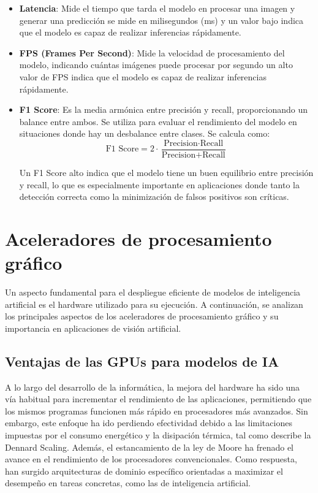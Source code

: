 \documentclass[11pt,spanish,listoffigures,listoftables]{tfgetsinf}
\begin{document}
\begin{itemize}
   \item \textbf{Latencia}: Mide el tiempo que tarda el modelo en procesar una imagen y generar una predicción se mide en milisegundos (ms) y un valor bajo indica que el modelo es capaz de realizar inferencias rápidamente.
   
   \item \textbf{FPS (Frames Per Second)}: Mide la velocidad de procesamiento del modelo, indicando cuántas imágenes puede procesar por segundo un alto valor de FPS indica que el modelo es capaz de realizar inferencias rápidamente.
   \item \textbf{F1 Score}: Es la media armónica entre precisión y recall, proporcionando un balance entre ambos. Se utiliza para evaluar el rendimiento del modelo en situaciones donde hay un desbalance entre clases. Se calcula como:
   \[
   \text{F1 Score} = 2 \cdot \frac{\text{Precision} \cdot \text{Recall}}{\text{Precision} + \text{Recall}}
   \]

   Un F1 Score alto indica que el modelo tiene un buen equilibrio entre precisión y recall, lo que es especialmente importante en aplicaciones donde tanto la detección correcta como la minimización de falsos positivos son críticas.

\end{itemize}


\section{Aceleradores de procesamiento gráfico}


Un aspecto fundamental para el despliegue eficiente de modelos de inteligencia artificial es el hardware utilizado para su ejecución. A continuación, se analizan los principales aspectos de los aceleradores de procesamiento gráfico y su importancia en aplicaciones de visión artificial.

\subsection{Ventajas de las GPUs para modelos de IA}
A lo largo del desarrollo de la informática, la mejora del hardware ha sido una vía habitual para incrementar el rendimiento de las aplicaciones, permitiendo que los mismos programas funcionen más rápido en procesadores más avanzados. Sin embargo, este enfoque ha ido perdiendo efectividad debido a las limitaciones impuestas por el consumo energético y la disipación térmica, tal como describe la Dennard Scaling. Además, el estancamiento de la ley de Moore ha frenado el avance en el rendimiento de los procesadores convencionales. Como respuesta, han surgido arquitecturas de dominio específico orientadas a maximizar el desempeño en tareas concretas, como las de inteligencia artificial.
\end{document}
